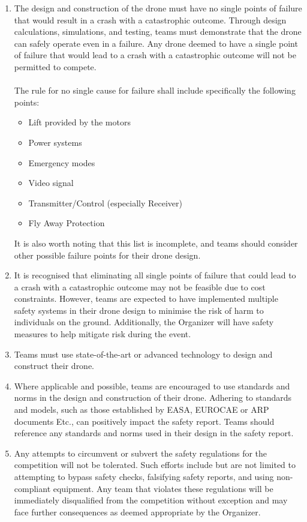 \documentclass{article}
\begin{document}
\begin{enumerate}
  \item The design and construction of the drone must have no single points of failure that would result in a crash with a catastrophic outcome. Through design calculations, simulations, and testing, teams must demonstrate that the drone can safely operate even in a failure. Any drone deemed to have a single point of failure that would lead to a crash with a catastrophic outcome will not be permitted to compete. \\ \\
  The rule for no single cause for failure shall include specifically the following points:
    \begin{itemize}
      \item Lift provided by the motors
      \item Power systems
      \item Emergency modes
      \item Video signal
      \item Transmitter/Control  (especially Receiver)
      \item Fly Away Protection 
    \end{itemize}
  It is also worth noting that this list is incomplete, and teams should consider other possible failure points for their drone design.
  \item It is recognised that eliminating all single points of failure that could lead to a crash with a catastrophic outcome may not be feasible due to cost constraints. However, teams are expected to have implemented multiple safety systems in their drone design to minimise the risk of harm to individuals on the ground. Additionally, the Organizer will have safety measures to help mitigate risk during the event.
  \item Teams must use state-of-the-art or advanced technology to design and construct their drone.
  \item Where applicable and possible, teams are encouraged to use standards and norms in the design and construction of their drone. Adhering to standards and models, such as those established by EASA, EUROCAE or ARP documents Etc., can positively impact the safety report. Teams should reference any standards and norms used in their design in the safety report.
  \item Any attempts to circumvent or subvert the safety regulations for the competition will not be tolerated. Such efforts include but are not limited to attempting to bypass safety checks, falsifying safety reports, and using non-compliant equipment. Any team that violates these regulations will be immediately disqualified from the competition without exception and may face further consequences as deemed appropriate by the Organizer.

\end{enumerate}
\end{document}
